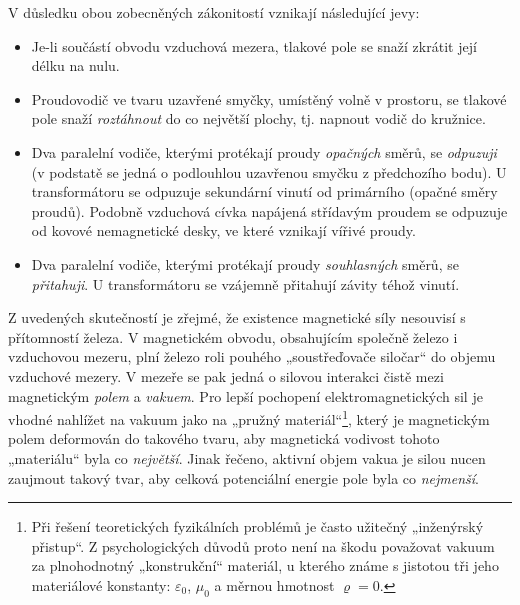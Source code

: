       V důsledku obou zobecněných zákonitostí vznikají následující jevy:
      \begin{itemize}\addtolength{\itemsep}{-0.5\baselineskip}
        \item Je-li součástí obvodu vzduchová mezera, tlakové pole se snaží zkrátit její délku na 
              nulu.
        \item Proudovodič ve tvaru uzavřené smyčky, umístěný volně v prostoru, se tlakové pole   
              snaží \emph{roztáhnout} do co největší plochy, tj. napnout vodič do kružnice.
        \item Dva paralelní vodiče, kterými protékají proudy \emph{opačných} směrů, se 
              \emph{odpuzuji} (v podstatě se jedná o podlouhlou uzavřenou smyčku z předchozího 
              bodu). U transformátoru se odpuzuje sekundární vinutí od primárního (opačné směry 
              proudů). Podobně vzduchová cívka napájená střídavým proudem se odpuzuje od kovové 
              nemagnetické desky, ve které vznikají vířivé proudy.
        \item Dva paralelní vodiče, kterými protékají proudy \emph{souhlasných} směrů, se 
              \emph{přitahuji}. U transformátoru se vzájemně přitahují závity téhož vinutí.
      \end{itemize}
      
      Z uvedených skutečností je zřejmé, že existence magnetické síly nesouvisí s přítomností 
      železa. V magnetickém obvodu, obsahujícím společně železo i vzduchovou mezeru, plní železo 
      roli pouhého „soustřeďovače siločar“ do objemu vzduchové mezery. V mezeře se pak jedná o 
      silovou interakci čistě mezi magnetickým \emph{polem} a \emph{vakuem}. Pro lepší pochopení 
      elektromagnetických sil je vhodné nahlížet na vakuum jako na „pružný materiál“\footnote{Při 
      řešení teoretických fyzikálních problémů je často užitečný „inženýrský přistup“. Z 
      psychologických důvodů proto není na škodu považovat vakuum za plnohodnotný „konstrukční“ 
      materiál, u kterého známe s jistotou tři jeho materiálové konstanty: \(\varepsilon_0\), 
      \(\mu_0\) a měrnou hmotnost \(\varrho = 0\).}, který je magnetickým polem 
      deformován do takového tvaru, aby magnetická vodivost tohoto „materiálu“ byla co 
      \emph{největší}. Jinak řečeno, aktivní objem vakua je silou nucen zaujmout takový tvar, aby 
      celková potenciální energie pole byla co \emph{nejmenší}.
      
